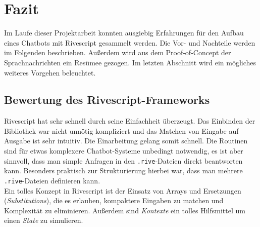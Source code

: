 \chapter{Fazit}
Im Laufe dieser Projektarbeit konnten ausgiebig Erfahrungen für den Aufbau eines Chatbots mit Rivescript gesammelt werden. Die Vor- und Nachteile werden im Folgenden beschrieben. Außerdem wird aus dem Proof-of-Concept der Sprachnachrichten ein Resümee gezogen. Im letzten Abschnitt wird ein mögliches weiteres Vorgehen beleuchtet.

\section{Bewertung des Rivescript-Frameworks}
Rivescript hat sehr schnell durch seine Einfachheit überzeugt. Das Einbinden der Bibliothek war nicht unnötig kompliziert und das Matchen von Eingabe auf Ausgabe ist sehr intuitiv. Die Einarbeitung gelang somit schnell. Die Routinen sind für etwas komplexere Chatbot-Systeme unbedingt notwendig, es ist aber sinnvoll, dass man simple Anfragen in den \texttt{.rive}-Dateien direkt beantworten kann. Besonders praktisch zur Strukturierung hierbei war, dass man mehrere \texttt{.rive}-Dateien definieren kann.\\
Ein tolles Konzept in Rivescript ist der Einsatz von Arrays und Ersetzungen (\textit{Substitutions}), die es erlauben, kompaktere Eingaben zu matchen und Komplexität zu eliminieren. Außerdem sind \textit{Kontexte} ein tolles Hilfsmittel um einen \textit{State} zu simulieren.

